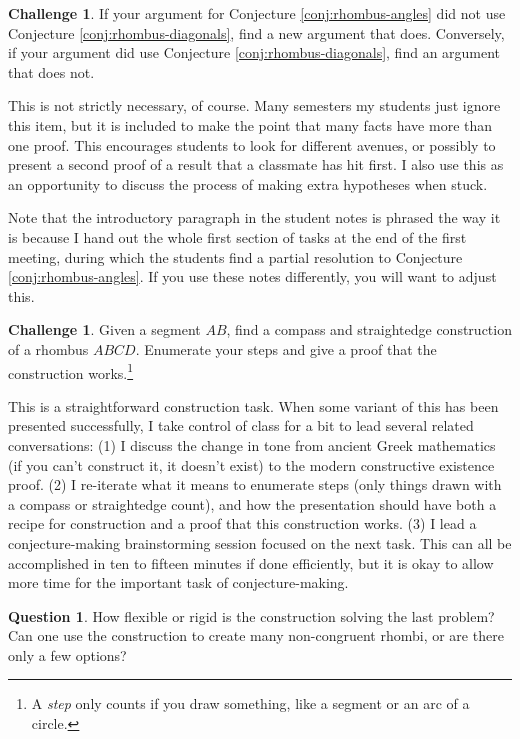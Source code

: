 \documentclass{tufte-handout}
\theoremstyle{definition}
\newtheorem{question}[problem]{Question}
\newtheorem{challenge}[problem]{Challenge}
\begin{document}
\begin{challenge}
\label{conj:rhombus-angles-redo}
If your argument for Conjecture \ref{conj:rhombus-angles} did not use Conjecture \ref{conj:rhombus-diagonals}, find a new argument that does.
Conversely, if your argument did use Conjecture \ref{conj:rhombus-diagonals}, find an argument that does not.
\end{challenge}

This is not strictly necessary, of course. 
Many semesters my students just ignore this item, but
it is included to make the point that many facts have more than one proof.
This encourages students to look for different avenues, or possibly to present a second proof of a result that a classmate has hit first.
I also use this as an opportunity to discuss the process of making extra hypotheses when stuck.

Note that the introductory paragraph in the student notes is phrased the way it is because I hand out the whole first section of tasks at the end of the first meeting, during which the students find a partial resolution to Conjecture \ref{conj:rhombus-angles}. If you use these notes differently, you will want to adjust this.


\begin{challenge}
\label{prob:rhombus-construct}
Given a segment $AB$, find a compass and straightedge construction of a rhombus $ABCD$.
Enumerate your steps and give a proof that the construction works.\footnote{A \emph{step} only counts if you draw something, like a segment or an arc of a circle.}
\end{challenge}

This is a straightforward construction task. When some variant of this has been presented successfully, I take control of class for a bit to lead several related conversations: 
(1) I discuss the change in tone from ancient Greek mathematics (if you can't construct it, it doesn't exist) to the modern constructive existence proof.
(2) I re-iterate what it means to enumerate steps (only things drawn with a compass or straightedge count), and how the presentation should have both a recipe for construction and a proof that this construction works.
(3) I lead a conjecture-making brainstorming session focused on the next task. 
This can all be accomplished in ten to fifteen minutes if done efficiently, but it is okay to allow more time for the important task of conjecture-making.

\begin{question}
\label{prob:rhombus-flexible}
How flexible or rigid is the construction solving the last problem?
Can one use the construction to create many non-congruent rhombi, or are there only a few options?
\end{question}
\end{document}
